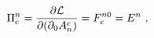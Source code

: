 \begin{equation}
\Pi_{c}^{n}  =    \frac{\partial {\cal{L}}}{\partial(\partial_0 A_n^c)} = F_c^{n0} = E^n~,        \label{eq:byuzsekiz}
\end{equation}

